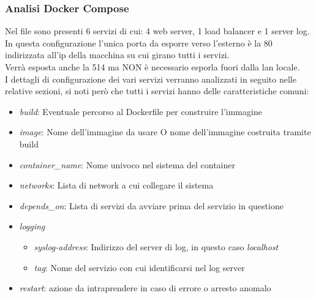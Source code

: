 \documentclass[../DocumentazioneProgetto.tex]{subfiles}
\begin{document}
	\subsubsection{Analisi Docker Compose}
	Nel file sono presenti 6 servizi di cui: 4 web server, 1 load balancer e 1 server log.\\
	In questa configurazione l'unica porta da esporre verso l'esterno è la 80 indirizzata all'ip della macchina su cui girano tutti i servizi.\\
	Verrà esposta anche la 514 ma NON è necessario esporla fuori dalla lan locale.\\
	I dettagli di configurazione dei vari servizi verranno analizzati in seguito nelle relative sezioni, si noti però
	che tutti i servizi hanno delle caratteristiche comuni:
	\begin{itemize}
		\item \textit{build}: Eventuale percorso al Dockerfile per construire l'immagine
		\item \textit{image}: Nome dell'immagine da usare O nome dell'immagine costruita tramite build
		\item \textit{container\_name}: Nome univoco nel sistema del container
		\item \textit{networks}: Lista di network a cui collegare il sistema
		\item \textit{depends\_on}: Lista di servizi da avviare prima del servizio in questione
		\item \textit{logging}
		\begin{itemize}
			\item \textit{syslog-address}: Indirizzo del server di log, in questo caso \textit{localhost} 
			\item \textit{tag}: Nome del servizio con cui identificarsi nel log server
		\end{itemize}
		\item \textit{restart}: azione da intraprendere in caso di errore o arresto anomalo
	\end{itemize}


\end{document}
